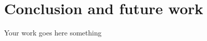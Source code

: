 \documentclass[12pt]{report}
\title{\thesistitle}
\author{\studentname}
\date{\today}
\begin{document}

%

%

%

%



\maketitle

%

\newpage
{}

\tableofcontents

\newpage

\listoffigures

\newpage
{}




\section{Conclusion and future work}
\label{sect-conclusion}
Your work goes here \cite{Resnick1997}
something \cite{CF} \cite{bigdata} \cite{Khusro2016} \cite{recommender_overview} \cite{figures} \cite{contentbased} \cite{CF} \cite{cf_figure}

\cleardoublepage
{}
%
%


%

\printbibliography
\end{document}
